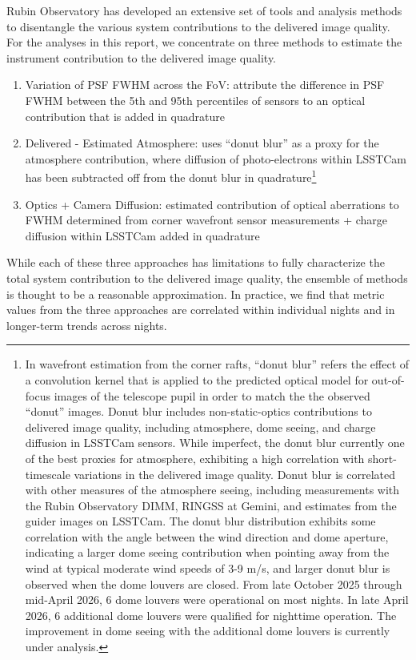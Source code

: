 \documentclass[OPS,lsst,authoryear,toc]{lsstdoc}
\begin{document}
Rubin Observatory has developed an extensive set of tools and analysis methods to disentangle the various system contributions to the delivered image quality.
For the analyses in this report, we concentrate on three methods to estimate the instrument contribution to the delivered image quality.

\begin{enumerate}
  \item Variation of PSF FWHM across the FoV: attribute the difference in PSF FWHM between the 5th and 95th percentiles of sensors to an optical contribution that is added in quadrature
  \item Delivered - Estimated Atmosphere: uses ``donut blur'' as a proxy for the atmosphere contribution, where diffusion of photo-electrons within LSSTCam has been subtracted off from the donut blur in quadrature\footnote{In wavefront estimation from the corner rafts, ``donut blur'' refers the effect of a convolution kernel that is applied to the predicted optical model for out-of-focus images of the telescope pupil in order to match the the observed ``donut'' images.
  Donut blur includes non-static-optics contributions to delivered image quality, including atmosphere, dome seeing, and charge diffusion in LSSTCam sensors.
  While imperfect, the donut blur currently one of the best proxies for atmosphere, exhibiting a high correlation with short-timescale variations in the delivered image quality.
  Donut blur is correlated with other measures of the atmosphere seeing, including measurements with the Rubin Observatory DIMM, RINGSS at Gemini, and estimates from the guider images on LSSTCam.
  The donut blur distribution exhibits some correlation with the angle between the wind direction and dome aperture, indicating a larger dome seeing contribution when pointing away from the wind at typical moderate wind speeds of 3-9 m/s, and larger donut blur is observed when the dome louvers are closed.
  From late October 2025 through mid-April 2026, 6 dome louvers were operational on most nights.
  In late April 2026, 6 additional dome louvers were qualified for nighttime operation.
  The improvement in dome seeing with the additional dome louvers is currently under analysis.
  }
  \item Optics + Camera Diffusion: estimated contribution of optical aberrations to FWHM determined from corner wavefront sensor measurements + charge diffusion within LSSTCam added in quadrature
\end{enumerate}

While each of these three approaches has limitations to fully characterize the total system contribution to the delivered image quality, the ensemble of methods is thought to be a reasonable approximation.
In practice, we find that metric values from the three approaches are correlated within individual nights and in longer-term trends across nights.
\end{document}
